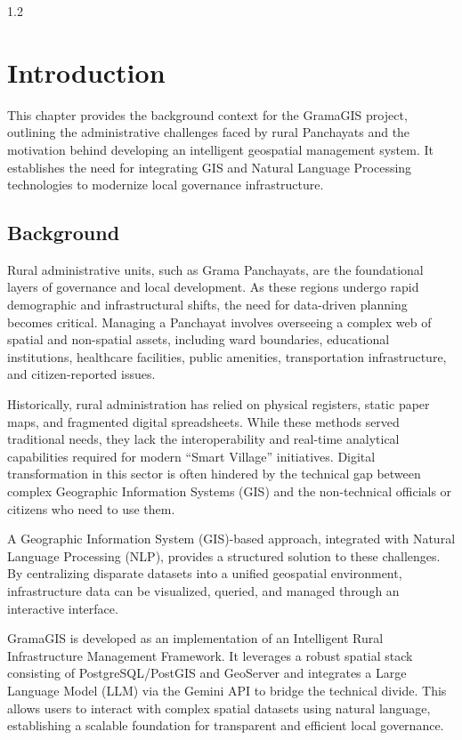 ﻿\newpage
\thispagestyle{empty}
\begin{spacing}{1.2}
\chapter{Introduction}

This chapter provides the background context for the GramaGIS project, outlining the administrative challenges faced by rural Panchayats and the motivation behind developing an intelligent geospatial management system. It establishes the need for integrating GIS and Natural Language Processing technologies to modernize local governance infrastructure.

\section{Background}
Rural administrative units, such as Grama Panchayats, are the foundational layers of governance and local development. As these regions undergo rapid demographic and infrastructural shifts, the need for data-driven planning becomes critical. Managing a Panchayat involves overseeing a complex web of spatial and non-spatial assets, including ward boundaries, educational institutions, healthcare facilities, public amenities, transportation infrastructure, and citizen-reported issues.

Historically, rural administration has relied on physical registers, static paper maps, and fragmented digital spreadsheets. While these methods served traditional needs, they lack the interoperability and real-time analytical capabilities required for modern ``Smart Village'' initiatives. Digital transformation in this sector is often hindered by the technical gap between complex Geographic Information Systems (GIS) and the non-technical officials or citizens who need to use them.

A Geographic Information System (GIS)-based approach, integrated with Natural Language Processing (NLP), provides a structured solution to these challenges. By centralizing disparate datasets into a unified geospatial environment, infrastructure data can be visualized, queried, and managed through an interactive interface.

GramaGIS is developed as an implementation of an Intelligent Rural Infrastructure Management Framework. It leverages a robust spatial stack consisting of PostgreSQL/PostGIS and GeoServer and integrates a Large Language Model (LLM) via the Gemini API to bridge the technical divide. This allows users to interact with complex spatial datasets using natural language, establishing a scalable foundation for transparent and efficient local governance.


\end{spacing}

